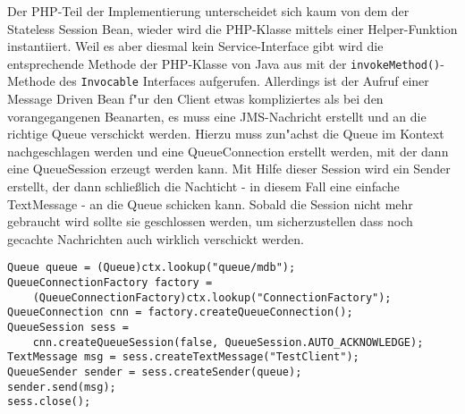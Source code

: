 Der PHP-Teil der Implementierung unterscheidet sich kaum von dem der Stateless Session Bean, wieder wird
die PHP-Klasse mittels einer Helper-Funktion instantiiert. Weil es aber diesmal kein Service-Interface gibt
wird die entsprechende Methode der PHP-Klasse von Java aus mit der \texttt{invokeMethod()}-Methode des
\texttt{Invocable} Interfaces aufgerufen.
Allerdings ist der Aufruf einer Message Driven Bean f"ur den Client etwas kompliziertes als bei den
vorangegangenen Beanarten, es muss eine JMS-Nachricht erstellt und an die richtige Queue verschickt werden.
Hierzu muss zun"achst die Queue im Kontext nachgeschlagen werden und eine QueueConnection erstellt werden, mit der
dann eine QueueSession erzeugt werden kann. Mit Hilfe dieser Session wird ein Sender erstellt, der dann
schlie\ss lich die Nachticht - in diesem Fall eine einfache TextMessage - an die Queue schicken kann. Sobald die Session
nicht mehr gebraucht wird sollte sie geschlossen werden, um sicherzustellen dass noch gecachte Nachrichten
auch wirklich verschickt werden.

\begin{lstlisting}[caption=Senden einer JMS-Nachricht]
Queue queue = (Queue)ctx.lookup("queue/mdb");
QueueConnectionFactory factory = 
    (QueueConnectionFactory)ctx.lookup("ConnectionFactory");
QueueConnection cnn = factory.createQueueConnection();
QueueSession sess = 
    cnn.createQueueSession(false, QueueSession.AUTO_ACKNOWLEDGE);
TextMessage msg = sess.createTextMessage("TestClient");
QueueSender sender = sess.createSender(queue);
sender.send(msg);
sess.close();
\end{lstlisting}



